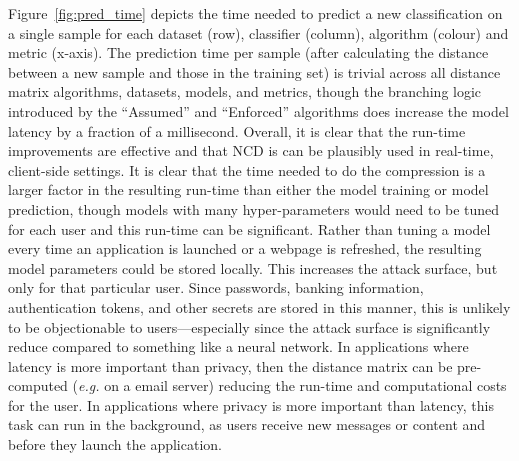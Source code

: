 \documentclass[preprint,12pt]{elsarticle}
\begin{document}
Figure~\ref{fig:pred_time} depicts the time needed to predict a new classification on a single sample for each dataset (row), classifier (column), algorithm (colour) and metric (x-axis). 
The prediction time per sample (after calculating the distance between a new sample and those in the training set) is trivial across all distance matrix algorithms, datasets, models, and metrics, though the branching logic introduced by the ``Assumed'' and ``Enforced'' algorithms does increase the model latency by a fraction of a millisecond.
Overall, it is clear that the run-time improvements are effective and that NCD is can be plausibly used in real-time, client-side settings. 
It is clear that the time needed to do the compression is a larger factor in the resulting run-time than either the model training or model prediction, though models with many hyper-parameters would need to be tuned for each user and this run-time can be significant. 
Rather than tuning a model every time an application is launched or a webpage is refreshed, the resulting model parameters could be stored locally.
This increases the attack surface, but only for that particular user. 
Since passwords, banking information, authentication tokens, and other secrets are stored in this manner, this is unlikely to be objectionable to users---especially since the attack surface is significantly reduce compared to something like a neural network. 
In applications where latency is more important than privacy, then the distance matrix can be pre-computed (\textit{e.g.} on a email server) reducing the run-time and computational costs for the user. 
In applications where privacy is more important than latency, this task can run in the background, as users receive new messages or content and before they launch the application. 


\end{document}
